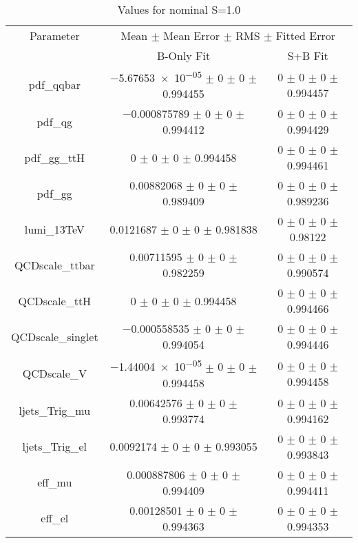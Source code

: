 \begin{table}
\centering
\caption{Values for nominal S=1.0}
\begin{tabular}{ccc}
\toprule
Parameter & \multicolumn{2}{c}{Mean $\pm$ Mean Error $\pm$ RMS $\pm$ Fitted Error}\\
 & B-Only Fit & S+B Fit\\
\midrule
pdf\_qqbar & \num{-5.67653e-05} $\pm$ \num{0} $\pm$ \num{0} $\pm$ \num{0.994455} & \num{0} $\pm$ \num{0} $\pm$ \num{0} $\pm$ \num{0.994457}\\
pdf\_qg & \num{-0.000875789} $\pm$ \num{0} $\pm$ \num{0} $\pm$ \num{0.994412} & \num{0} $\pm$ \num{0} $\pm$ \num{0} $\pm$ \num{0.994429}\\
pdf\_gg\_ttH & \num{0} $\pm$ \num{0} $\pm$ \num{0} $\pm$ \num{0.994458} & \num{0} $\pm$ \num{0} $\pm$ \num{0} $\pm$ \num{0.994461}\\
pdf\_gg & \num{0.00882068} $\pm$ \num{0} $\pm$ \num{0} $\pm$ \num{0.989409} & \num{0} $\pm$ \num{0} $\pm$ \num{0} $\pm$ \num{0.989236}\\
lumi\_13TeV & \num{0.0121687} $\pm$ \num{0} $\pm$ \num{0} $\pm$ \num{0.981838} & \num{0} $\pm$ \num{0} $\pm$ \num{0} $\pm$ \num{0.98122}\\
QCDscale\_ttbar & \num{0.00711595} $\pm$ \num{0} $\pm$ \num{0} $\pm$ \num{0.982259} & \num{0} $\pm$ \num{0} $\pm$ \num{0} $\pm$ \num{0.990574}\\
QCDscale\_ttH & \num{0} $\pm$ \num{0} $\pm$ \num{0} $\pm$ \num{0.994458} & \num{0} $\pm$ \num{0} $\pm$ \num{0} $\pm$ \num{0.994466}\\
QCDscale\_singlet & \num{-0.000558535} $\pm$ \num{0} $\pm$ \num{0} $\pm$ \num{0.994054} & \num{0} $\pm$ \num{0} $\pm$ \num{0} $\pm$ \num{0.994446}\\
QCDscale\_V & \num{-1.44004e-05} $\pm$ \num{0} $\pm$ \num{0} $\pm$ \num{0.994458} & \num{0} $\pm$ \num{0} $\pm$ \num{0} $\pm$ \num{0.994458}\\
ljets\_Trig\_mu & \num{0.00642576} $\pm$ \num{0} $\pm$ \num{0} $\pm$ \num{0.993774} & \num{0} $\pm$ \num{0} $\pm$ \num{0} $\pm$ \num{0.994162}\\
ljets\_Trig\_el & \num{0.0092174} $\pm$ \num{0} $\pm$ \num{0} $\pm$ \num{0.993055} & \num{0} $\pm$ \num{0} $\pm$ \num{0} $\pm$ \num{0.993843}\\
eff\_mu & \num{0.000887806} $\pm$ \num{0} $\pm$ \num{0} $\pm$ \num{0.994409} & \num{0} $\pm$ \num{0} $\pm$ \num{0} $\pm$ \num{0.994411}\\
eff\_el & \num{0.00128501} $\pm$ \num{0} $\pm$ \num{0} $\pm$ \num{0.994363} & \num{0} $\pm$ \num{0} $\pm$ \num{0} $\pm$ \num{0.994353}\\

\end{tabular}
\end{table}
